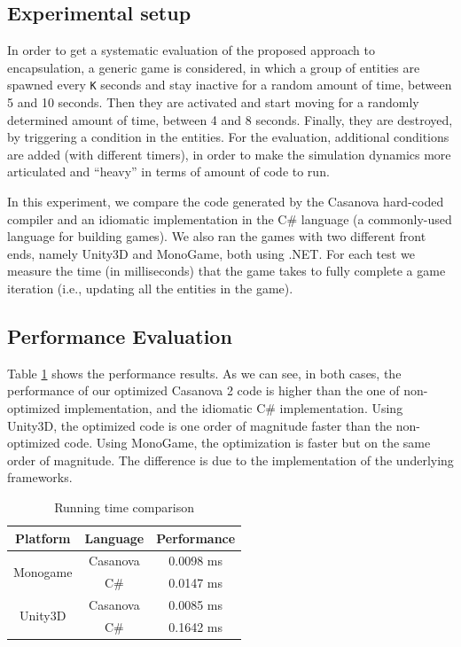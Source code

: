 \subsection{Experimental setup} In order to get a systematic evaluation of the proposed approach to encapsulation, a generic game is considered, in which a group of entities are spawned every \texttt{K} seconds and stay inactive for a random amount of time, between 5 and 10 seconds. Then they are activated and start moving for a randomly determined amount of time, between 4 and 8 seconds. Finally, they are destroyed, by triggering a condition in the entities. For the evaluation, additional conditions are added (with different timers), in order to make the simulation dynamics more articulated and ``heavy'' in terms of amount of code to run.


In this experiment, we compare the code generated by the Casanova hard-coded compiler and an idiomatic implementation in the C\# language (a commonly-used language for building games). We also ran the games with two different front ends, namely Unity3D and MonoGame, both using .NET.
For each test we measure the time (in milliseconds) that the game takes to fully complete a game iteration (i.e., updating all the entities in the game).

\subsection{Performance Evaluation} Table \ref{tab:ch_networking_times} shows the performance results. As we can see, in both cases, the performance of our optimized Casanova 2 code is higher than the one of non-optimized implementation, and the idiomatic C\# implementation. Using Unity3D, the optimized code is one order of magnitude faster than the non-optimized code. Using MonoGame, the optimization is faster but on the same order of magnitude. The difference is due to the implementation of the underlying frameworks.

\begin{table}
\centering
\begin{tabular}{|c|c|c|}
\hline
 Platform & Language & Performance\\ \hline
\multirow{2}{*}{Monogame}
  & Casanova & 0.0098 ms\\
  & C\# & 0.0147 ms\\ \hline
\multirow{2}{*}{Unity3D}
  & Casanova & 0.0085 ms\\
  & C\# & 0.1642 ms\\ 
  \hline
\end{tabular}
\caption{Running time comparison}
\label{tab:ch_networking_times}
\end{table}

